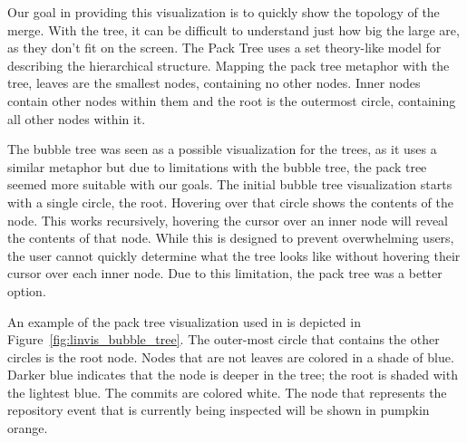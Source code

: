 Our goal in providing this visualization is to quickly show the topology
of the merge. With the \rt{} tree, it can be difficult to understand
just how big the large \mt{} are, as they don't fit on the screen. The
Pack Tree uses a set theory-like model for describing the hierarchical
structure. Mapping the pack tree metaphor with the tree, leaves are the
smallest nodes, containing no other nodes. Inner nodes contain other
nodes within them and the root is the outermost circle, containing all
other nodes within it.

The bubble tree\cite{Boardman2000} was seen as a possible visualization
for the trees, as it uses a similar metaphor but due to limitations with
the bubble tree, the pack tree seemed more suitable with our goals. The
initial bubble tree visualization starts with a single circle, the root.
Hovering over that circle shows the contents of the node. This works
recursively, hovering the cursor over an inner node will reveal the
contents of that node. While this is designed to prevent overwhelming
users, the user cannot quickly determine what the tree looks like
without hovering their cursor over each inner node. Due to this
limitation, the pack tree was a better option.

An example of the pack tree visualization used in \tool{} is depicted in
Figure~\ref{fig:linvis_bubble_tree}. The outer-most circle that contains
the other circles is the root node. Nodes that are not leaves are
colored in a shade of blue. Darker blue indicates that the node is
deeper in the tree; the root is shaded with the lightest blue. The
commits are colored white. The node that represents the repository event
that is currently being inspected will be shown in pumpkin orange.
